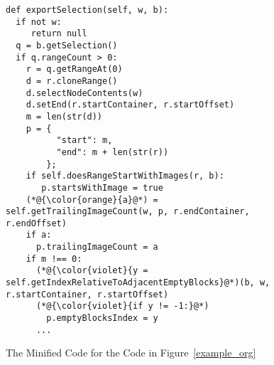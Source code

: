 \begin{figure}[t]
	\centering
	\begin{lstlisting}[]
def exportSelection(self, w, b):
  if not w:
     return null
  q = b.getSelection()
  if q.rangeCount > 0:
    r = q.getRangeAt(0)
    d = r.cloneRange()
    d.selectNodeContents(w)
    d.setEnd(r.startContainer, r.startOffset)
    m = len(str(d))
    p = {
          "start": m,
          "end": m + len(str(r))
        };
    if self.doesRangeStartWithImages(r, b):
       p.startsWithImage = true
    (*@{\color{orange}{a}@*) = self.getTrailingImageCount(w, p, r.endContainer, r.endOffset)
    if a:
      p.trailingImageCount = a
    if m !== 0:
      (*@{\color{violet}{y = self.getIndexRelativeToAdjacentEmptyBlocks}@*)(b, w, r.startContainer, r.startOffset)
      (*@{\color{violet}{if y != -1:}@*)
        p.emptyBlocksIndex = y
      ...
\end{lstlisting}
\vspace{-15pt}
\caption{The Minified Code for the Code in Figure~\ref{example_org}}
\label{example_sim}
\end{figure}
